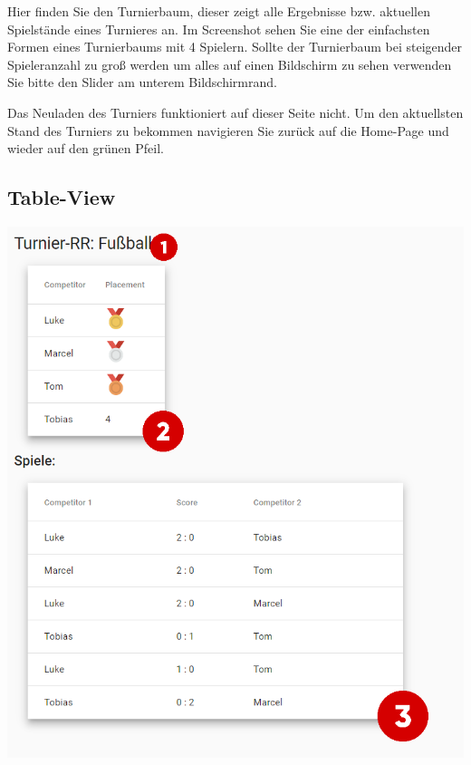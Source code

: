 Hier finden Sie den Turnierbaum, dieser zeigt alle Ergebnisse bzw. aktuellen Spielstände eines Turnieres an.
Im Screenshot sehen Sie eine der einfachsten Formen eines Turnierbaums mit 4 Spielern. Sollte der Turnierbaum bei
steigender Spieleranzahl zu groß werden um alles auf einen Bildschirm zu sehen verwenden Sie bitte den Slider am unterem Bildschirmrand.

Das Neuladen des Turniers funktioniert auf dieser Seite nicht. Um den aktuellsten Stand des Turniers zu bekommen navigieren Sie zurück auf die Home-Page und wieder auf den grünen Pfeil.

\bigskip
\subsection{Table-View}
\includegraphics[scale=0.5]{pics/user-guide/table-view.PNG}

